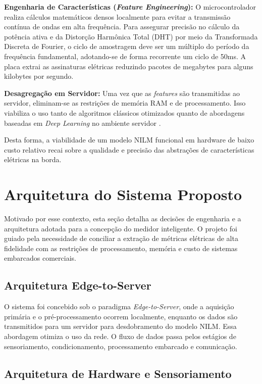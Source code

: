\documentclass[12pt]{article}
\begin{document}
\textbf{Engenharia de Caracter\'isticas (\textit{Feature Engineering}):} O
microcontrolador realiza c\'alculos matem\'aticos densos localmente para evitar a
transmiss\~ao cont\'inua de ondas em alta frequ\^encia. Para assegurar precis\~ao
no c\'alculo da pot\^encia ativa e da Distor\c{c}\~ao Harm\^onica Total (DHT) por
meio da Transformada Discreta de Fourier, o ciclo de amostragem deve ser um
m\'ultiplo do per\'iodo da frequ\^encia fundamental, adotando-se de forma
recorrente um ciclo de 50ms. A placa extrai as assinaturas el\'etricas reduzindo
pacotes de megabytes para alguns kilobytes por segundo.

\textbf{Desagrega\c{c}\~ao em Servidor:} Uma vez que as \textit{features} s\~ao
transmitidas ao servidor, eliminam-se as restri\c{c}\~oes de mem\'oria RAM e de
processamento. Isso viabiliza o uso tanto de algoritmos cl\'assicos otimizados
\citep{ref6} quanto de abordagens baseadas em \textit{Deep Learning} no ambiente
servidor \citep{ref7}.

Desta forma, a viabilidade de um modelo NILM funcional em hardware de baixo custo
relativo recai sobre a qualidade e precis\~ao das abstra\c{c}\~oes de
caracter\'isticas el\'etricas na borda.


\section{Arquitetura do Sistema Proposto}

Motivado por esse contexto, esta se\c{c}\~ao detalha as decis\~oes de engenharia e
a arquitetura adotada para a concep\c{c}\~ao do medidor inteligente. O projeto foi
guiado pela necessidade de conciliar a extra\c{c}\~ao de m\'etricas el\'etricas de
alta fidelidade com as restri\c{c}\~oes de processamento, mem\'oria e custo de
sistemas embarcados comerciais.

\subsection{Arquitetura Edge-to-Server}

O sistema foi concebido sob o paradigma \textit{Edge-to-Server}, onde a aquisi\c{c}\~ao
prim\'aria e o pr\'e-processamento ocorrem localmente, enquanto os dados s\~ao
transmitidos para um servidor para desdobramento do modelo NILM. Essa abordagem
otimiza o uso da rede. O fluxo de dados passa pelos est\'agios de sensoriamento,
condicionamento, processamento embarcado e comunica\c{c}\~ao.

\subsection{Arquitetura de Hardware e Sensoriamento}
\end{document}
